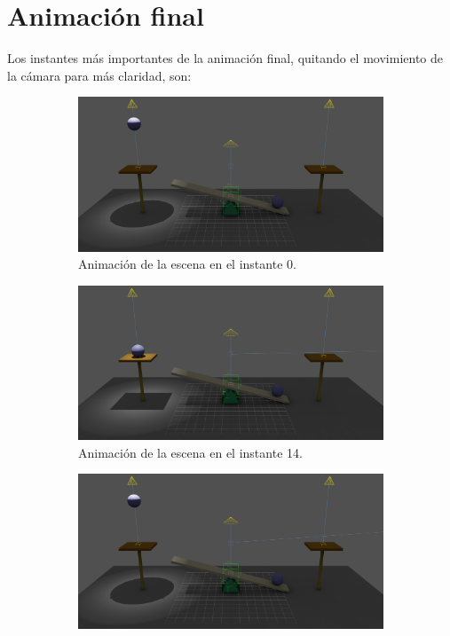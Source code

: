 \documentclass{article}
\begin{document}
\section{Animación final}

Los instantes más importantes de la animación final, quitando el movimiento de la cámara para más claridad, son:

\begin{figure}[H]
    \centering 
\begin{subfigure}[t]{0.48\textwidth}
    \centering
    \includegraphics[width=\textwidth]{imagenes/animaciones/general/0.png}
    \caption{Animación de la escena en el instante 0.}
 \end{subfigure}
\hfill
 \begin{subfigure}[t]{0.48\textwidth}
    \centering
    \includegraphics[width=\textwidth]{imagenes/animaciones/general/14.png}
    \caption{Animación de la escena en el instante 14.}
 \end{subfigure}
\hfill
 \begin{subfigure}[t]{0.48\textwidth}
    \centering
    \includegraphics[width=\textwidth]{imagenes/animaciones/general/26.png}

\end{subfigure}
\end{figure}
\end{document}
